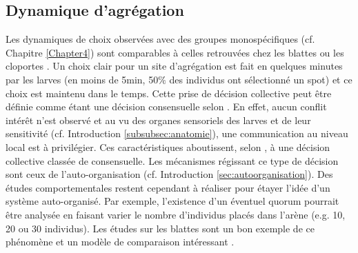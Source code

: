 		\subsection{Dynamique d'agrégation}
Les dynamiques de choix observées avec des groupes monospécifiques (cf. Chapitre \ref{Chapter4}) sont comparables à celles retrouvées chez les blattes \citep{canonge_self-amplification_2009,jeanson_self-organized_2005} ou les cloportes \cite{devigne_individual_2011}. Un choix clair pour un site d'agrégation est fait en quelques minutes par les larves (en moins de 5min, 50$\%$ des individus ont sélectionné un spot) et ce choix est maintenu dans le temps. Cette prise de décision collective peut être définie comme étant une décision consensuelle selon \citet{conradt_consensus_2005}. En effet, aucun conflit intérêt\footnotemark[1] n'est observé et au vu des organes sensoriels des larves et de leur sensitivité (cf. Introduction \ref{subsubsec:anatomie}), une communication au niveau local\footnotemark[2] est à privilégier. Ces caractéristiques aboutissent, selon \citet{conradt_consensus_2005}, à une décision collective classée de consensuelle. Les mécanismes régissant ce type de décision sont ceux de l'auto-organisation (cf. Introduction \ref{sec:autoorganisation}). Des études comportementales restent cependant à réaliser pour étayer l'idée d'un système auto-organisé. Par exemple, l'existence d'un éventuel quorum\footnotemark[3] pourrait être analysée en faisant varier le nombre d'individus placés dans l'arène (e.g. 10, 20 ou 30 individus). Les études sur les blattes sont un bon exemple de ce phénomène et un modèle de comparaison intéressant \citep{sempo_complex_2009,jeanson_self-organized_2005}.

